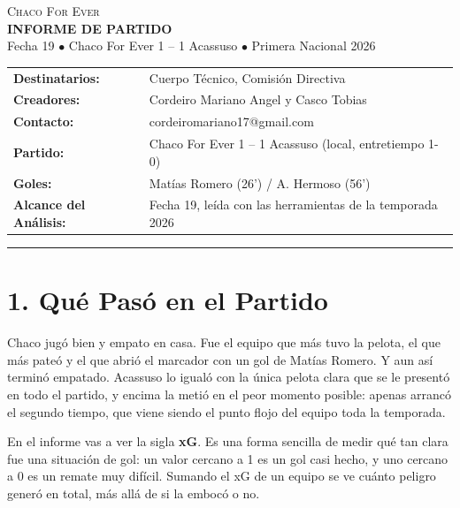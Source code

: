 \documentclass[11pt, a4paper]{article}
\begin{document}
\begin{center}
  \colorbox{primary}{%
    \parbox{\dimexpr\textwidth-2\fboxsep\relax}{%
      \vspace{4mm}
      \centering
      \color{white}
      \textsc{\Large Chaco For Ever} \\
      \smallskip
      \textbf{\Large INFORME DE PARTIDO} \\
      \vspace{1mm}
      \small Fecha 19 $\bullet$ Chaco For Ever 1 -- 1 Acassuso $\bullet$ Primera Nacional 2026
      \vspace{4mm}
    }%
  }
\end{center}

\vspace{4mm}

\begin{tabular}{ll}
  \textbf{Destinatarios:} & Cuerpo Técnico, Comisión Directiva \\
  \textbf{Creadores:} & Cordeiro Mariano Angel y Casco Tobias \\
  \textbf{Contacto:} & cordeiromariano17@gmail.com \\
  \textbf{Partido:} & Chaco For Ever 1 -- 1 Acassuso (local, entretiempo 1-0) \\
  \textbf{Goles:} & Matías Romero (26') \quad / \quad A. Hermoso (56') \\
  \textbf{Alcance del Análisis:} & Fecha 19, leída con las herramientas de la temporada 2026 \\
\end{tabular}

\vspace{4mm}
\hrule
\vspace{4mm}

\section*{1. Qué Pasó en el Partido}

Chaco jugó bien y empato en casa. Fue el equipo que más tuvo la pelota, el que más pateó y el que abrió el marcador con un gol de Matías Romero. Y aun así terminó empatado. Acassuso lo igualó con la única pelota clara que se le presentó en todo el partido, y encima la metió en el peor momento posible: apenas arrancó el segundo tiempo, que viene siendo el punto flojo del equipo toda la temporada.

En el informe vas a ver la sigla \textbf{xG}. Es una forma sencilla de medir qué tan clara fue una situación de gol: un valor cercano a 1 es un gol casi hecho, y uno cercano a 0 es un remate muy difícil. Sumando el xG de un equipo se ve cuánto peligro generó en total, más allá de si la embocó o no.
\end{document}
